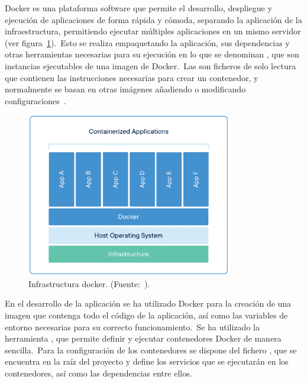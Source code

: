
Docker es una plataforma software que permite el desarrollo, despliegue y ejecución de aplicaciones de forma rápida y
cómoda, separando la aplicación de la infraestructura, permitiendo ejecutar múltiples aplicaciones en un mismo servidor
(ver figura~\ref{fig:docker-container-infrastructure}).\ Esto se realiza empaquetando la
aplicación, sus dependencias y otras herramientas necesarias para su ejecución en lo que se denominan
, que son instancias ejecutables de una imagen de Docker.\ Las  son
ficheros de solo lectura que contienen las instrucciones necesarias para crear un contenedor, y normalmente se basan
en otras imágenes añadiendo o modificando configuraciones~\cite{docker-docs}.

\begin{figure}[ht]
	\centering
	\includegraphics[width=0.8\textwidth]{res/images/container-what-is-container}
	\caption{Infrastructura docker. (Fuente:~\cite{docker-container:online}).}
	\label{fig:docker-container-infrastructure}
\end{figure}

En el desarrollo de la aplicación se ha utilizado Docker para la creación de una imagen que contenga todo el código de
la aplicación, así como las variables de entorno necesarias para su correcto funcionamiento.\ Se ha
utilizado la herramienta , que permite definir y ejecutar contenedores Docker de manera
sencilla.\ Para la configuración de los contenedores se dispone del fichero , que se
encuentra en la raíz del proyecto y define los servicios que se ejecutarán en los contenedores, así como
las dependencias entre ellos.

